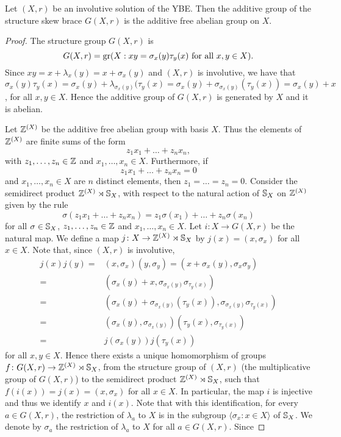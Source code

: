 \begin{theorem}\label{thm:involstruct}
Let $(X,r)$ be an involutive solution of the YBE. Then the additive group of the structure skew brace $G(X,r)$ is the additive free abelian group on $X$.
\end{theorem}

\begin{proof}
The structure group $G(X,r)$ is
\[ G(X,r)=\operatorname{gr}(X : xy=\sigma_x(y)\tau_y(x)\text{ for all }x,y\in X ).\]
Since $xy=x+\lambda_x(y)=x+\sigma_x(y)$ and $(X,r)$ is involutive, we have that $\sigma_x(y)\tau_y(x)=\sigma_x(y)+\lambda_{\sigma_x(y)}(\tau_y(x)=\sigma_x(y)+\sigma_{\sigma_x(y)}(\tau_y(x))=\sigma_x(y)+x$,
for all $x,y\in X$. Hence the additive group of $G(X,r)$ is generated by $X$ and it is abelian.

Let $\mathbb{Z}^{(X)}$ be the additive free abelian group with basis $X$. Thus the elements of $\mathbb{Z}^{(X)}$ are finite sums of the form
\[ z_1x_1+\dots +z_nx_n,\]
with $z_1,\dots ,z_n\in\mathbb{Z}$ and $x_1,\dots ,x_n\in X$. Furthermore, if 
\[ z_1x_1+\dots +z_nx_n=0\]
and $x_1,\dots ,x_n\in X$ are $n$ distinct elements, then $z_1=\dots =z_n=0$. Consider the semidirect product $\mathbb{Z}^{(X)}\rtimes \mathbb{S}_X$, with respect to the natural action of $\mathbb{S}_X$ on $\mathbb{Z}^{(X)}$ given by the rule
\[ 
\sigma(z_1x_1+\dots +z_nx_n)=z_1\sigma(x_1)+\dots +z_n\sigma(x_n)
\]
for all $\sigma\in\mathbb{S}_X$, $z_1,\dots ,z_n\in\mathbb{Z}$ 
and $x_1,\dots,x_n\in X$. Let $i\colon X\to G(X,r)$ be the natural map.
We define a map $j\colon X\to \mathbb{Z}^{(X)}\rtimes \mathbb{S}_X$ by $j(x)=(x,\sigma_x)$ for all $x\in X$. Note that, since $(X,r)$ is involutive, 
\begin{align*}
    j(x)j(y)=&(x,\sigma_x)(y,\sigma_y)=(x+\sigma_x(y),\sigma_x\sigma_y)\\
    =&(\sigma_x(y)+x,\sigma_{\sigma_x(y)}\sigma_{\tau_y(x)})\\
    =&(\sigma_x(y)+\sigma_{\sigma_x(y)}(\tau_y(x)),\sigma_{\sigma_x(y)}\sigma_{\tau_y(x)})\\
    =&(\sigma_x(y),\sigma_{\sigma_x(y)})(\tau_y(x),\sigma_{\tau_y(x)})\\
    =&j(\sigma_x(y))j(\tau_y(x))
\end{align*}
for all $x,y\in X$. Hence there exists a unique homomorphism of groups  
$f\colon G(X,r)\to \mathbb{Z}^{(X)}\rtimes \mathbb{S}_X$, from the structure group of $(X,r)$ (the multiplicative group of $G(X,r)$) to the semidirect product $\mathbb{Z}^{(X)}\rtimes \mathbb{S}_X$, such that $f(i(x))=j(x)=(x,\sigma_x)$ for all $x\in X$. In particular, the map $i$ is injective and thus we identify $x$ and $i(x)$. Note that with this identification, for every $a\in G(X,r)$, the restriction of $\lambda_a$ to $X$ is in the subgroup $\langle \sigma_x :x\in X\rangle$ of $\mathbb{S}_X$. We denote by $\sigma_a$ the restriction of $\lambda_a$ to $X$ for all $a\in G(X,r)$.  Since

\end{proof}
